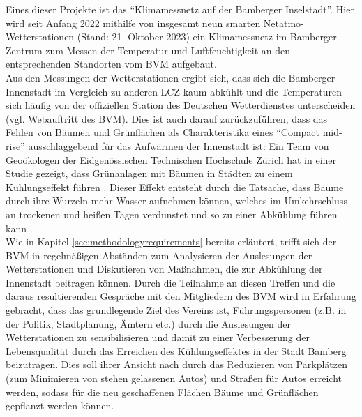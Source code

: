 Eines dieser Projekte ist das \enquote{Klimamessnetz auf der Bamberger Inselstadt}. Hier wird seit Anfang 2022 mithilfe von insgesamt neun smarten Netatmo-Wetterstationen (Stand: 21. Oktober 2023) ein Klimamessnetz im Bamberger Zentrum zum Messen der Temperatur und Luftfeuchtigkeit an den entsprechenden Standorten vom \ac{BVM} aufgebaut. \\ Aus den Messungen der Wetterstationen ergibt sich, dass sich die Bamberger Innenstadt im Vergleich zu anderen \ac{LCZ} kaum abkühlt und die Temperaturen sich häufig von der offiziellen Station des Deutschen Wetterdienstes unterscheiden (vgl. Webauftritt des \ac{BVM}). Dies ist auch darauf zurückzuführen, dass das Fehlen von Bäumen und Grünflächen als Charakteristika eines \enquote{Compact mid-rise} ausschlaggebend für das Aufwärmen der Innenstadt ist: Ein Team von Geoökologen der Eidgenössischen Technischen Hochschule Zürich hat in einer Studie gezeigt, dass Grünanlagen mit Bäumen in Städten zu einem Kühlungseffekt führen \cite{bastin2019global}. Dieser Effekt entsteht durch die Tatsache, dass Bäume durch ihre Wurzeln mehr Wasser aufnehmen können, welches im Umkehrschluss an trockenen und heißen Tagen verdunstet und so zu einer Abkühlung führen kann \cite{bastin2019global}. \\ Wie in Kapitel \ref{sec:methodologyrequirements} bereits erläutert, trifft sich der \ac{BVM} in regelmäßigen Abständen zum Analysieren der Auslesungen der Wetterstationen und Diskutieren von Maßnahmen, die zur Abkühlung der Innenstadt beitragen können. Durch die Teilnahme an diesen Treffen und die daraus resultierenden Gespräche mit den Mitgliedern des \ac{BVM} wird in Erfahrung gebracht, dass das grundlegende Ziel des Vereins ist, Führungspersonen (z.B. in der Politik, Stadtplanung, Ämtern etc.) durch die Auslesungen der Wetterstationen zu sensibilisieren und damit zu einer Verbesserung der Lebensqualität durch das Erreichen des Kühlungseffektes in der Stadt Bamberg beizutragen. Dies soll ihrer Ansicht nach durch das Reduzieren von Parkplätzen (zum Minimieren von stehen gelassenen Autos) und Straßen für Autos erreicht werden, sodass für die neu geschaffenen Flächen Bäume und Grünflächen gepflanzt werden können.

